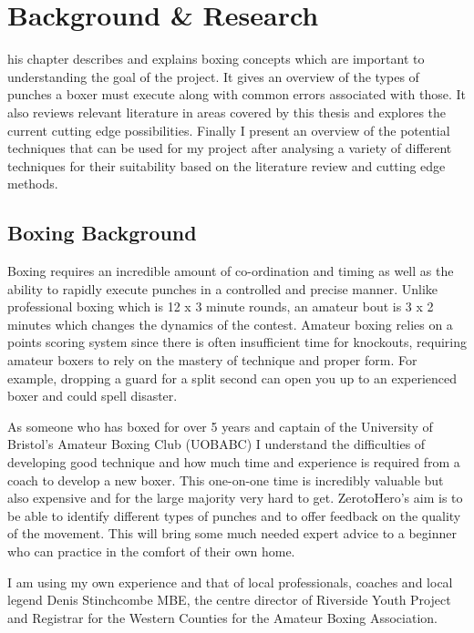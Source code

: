%
%
\let\textcircled=\pgftextcircled
\chapter{Background \& Research}
\label{chap:intro}

his chapter describes and explains boxing concepts which are important to understanding the goal of the project. It gives an overview of the types of punches a boxer must execute along with common errors associated with those. It also reviews relevant literature in areas covered by this thesis and explores the current cutting edge possibilities. Finally I present an overview of the potential techniques that can be used for my project after analysing a variety of different techniques for their suitability based on the literature review and cutting edge methods.

\section{Boxing Background}
\label{sec:sec01}
Boxing requires an incredible amount of co-ordination and timing as well as the ability to rapidly execute punches in a controlled and precise manner. Unlike professional boxing which is 12 x 3 minute rounds, an amateur bout is 3 x 2 minutes which changes the dynamics of the contest. Amateur boxing relies on a points scoring system since there is often insufficient time for knockouts, requiring amateur boxers to rely on the mastery of technique and proper form. For example, dropping a guard for a split second can open you up to an experienced boxer and could spell disaster.

As someone who has boxed for over 5 years and captain of the University of Bristol's Amateur Boxing Club (UOBABC) I understand the difficulties of developing good technique and how much time and experience is required from a coach to develop a new boxer. This one-on-one time is incredibly valuable but also expensive and for the large majority very hard to get. ZerotoHero's aim is to be able to identify different types of punches and to offer feedback on the quality of the movement. This will bring some much needed expert advice to a beginner who can practice in the comfort of their own home.

I am using my own experience and that of local professionals, coaches and local legend Denis Stinchcombe MBE, the centre director of Riverside Youth Project and Registrar for the Western Counties for the Amateur Boxing Association.
 

